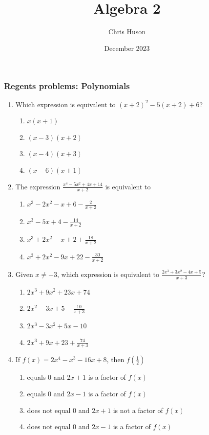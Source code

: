 \documentclass[12pt, twoside]{article}
\title{Algebra 2}
\author{Chris Huson}
\date{December 2023}
\begin{document}
\subsubsection*{Regents problems: Polynomials}
\begin{enumerate}[itemsep=0.5cm]
\item Which expression is equivalent to $(x + 2)^2 - 5(x + 2) + 6$? %
\begin{enumerate}
    \item $x(x + 1)$
    \item $(x - 3)(x + 2)$
    \item $(x - 4)(x + 3)$
    \item $(x - 6)(x + 1)$
\end{enumerate}

\item The expression $\displaystyle \frac{x^4 - 5x^2 + 4x + 14}{x+2}$ is equivalent to %
\begin{enumerate}
    \item $\displaystyle x^3 - 2x^2 - x + 6 - \frac{2}{x + 2}$
    \item $\displaystyle x^3 - 5x + 4 - \frac{14}{x + 2}$
    \item $\displaystyle x^3 + 2x^2 - x + 2 + \frac{18}{x + 2}$
    \item $\displaystyle x^3 + 2x^2 - 9x + 22 - \frac{30}{x + 2}$
\end{enumerate}

\item Given $x \ne -3$, which expression is equivalent to $\displaystyle \frac{2x^3 + 3x^2 - 4x + 5}{x+3}$? %
\begin{enumerate}
    \item $\displaystyle 2x^3 + 9x^2 + 23x + 74$
    \item $\displaystyle 2x^2 - 3x + 5 - \frac{10}{x+3}$
    \item $\displaystyle 2x^3 -3x^2 + 5x - 10$
    \item $\displaystyle 2x^3 + 9x + 23 + \frac{74}{x+3}$
\end{enumerate}

\item If \(f(x) = 2x^4 - x^3 - 16x + 8\), then \(f\left(\frac{1}{2}\right)\) %
\begin{enumerate}
    \item equals 0 and \(2x + 1\) is a factor of \(f(x)\)
    \item equals 0 and \(2x - 1\) is a factor of \(f(x)\)
    \item does not equal 0 and \(2x + 1\) is not a factor of \(f(x)\)
    \item does not equal 0 and \(2x - 1\) is a factor of \(f(x)\)
\end{enumerate}


\end{enumerate}
\end{document}

